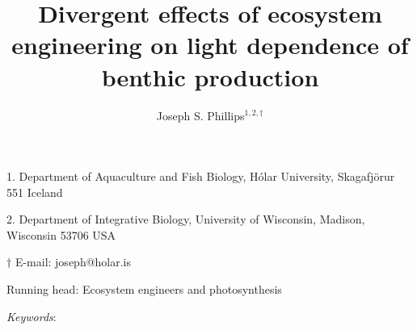 \documentclass[12pt]{article}
\title{Divergent effects of ecosystem engineering on light dependence of benthic production}
\author{
Joseph S. Phillips$^{1,2,\dagger}$}
\date{}
\begin{document}
\raggedright
\setlength\parindent{0.25in}

\maketitle

\noindent{} 1. Department of Aquaculture and Fish Biology, H\'{o}lar University, Skagafj\"{o}r{\dh}ur 551 Iceland

\noindent{} 2. Department of Integrative Biology, University of Wisconsin, Madison, Wisconsin 53706 USA

\noindent{} $\dagger$ E-mail: joseph@holar.is

\bigskip

Running head: {Ecosystem engineers and photosynthesis}

\linenumbers{}

\clearpage








\bigskip

\textit{Keywords}: {}











\end{document}
